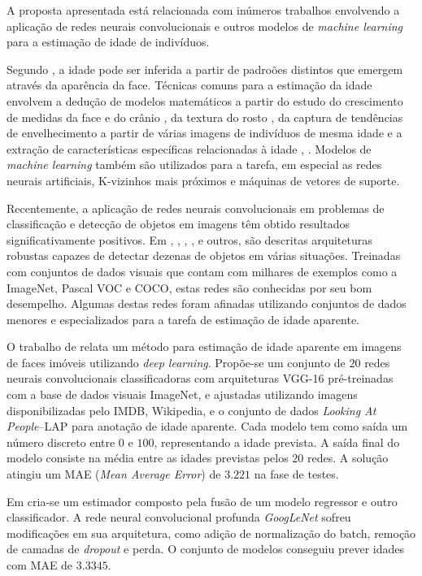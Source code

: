 A proposta apresentada está relacionada com inúmeros trabalhos envolvendo a aplicação de redes neurais convolucionais e outros modelos de \emph{machine learning} para a estimação de idade de indivíduos. 

Segundo \cite{fu2010age}, a idade pode ser inferida a partir de padroões distintos que emergem através da aparência da face. Técnicas comuns para a estimação da idade envolvem a dedução de modelos matemáticos a partir do estudo do crescimento de medidas da face e do crânio \cite{kwon1999age}, da textura do rosto \cite{lanitis2002toward}, da captura de tendências de envelhecimento a partir de várias imagens de indivíduos de mesma idade \cite{fu2007estimating} e a extração de características específicas relacionadas à idade \cite{suo2008design}, \cite{lou2018expression}. Modelos de \emph{machine learning} também são utilizados para a tarefa, em especial as redes neurais artificiais, K-vizinhos mais próximos e máquinas de vetores de suporte.

Recentemente, a aplicação de redes neurais convolucionais em problemas de classificação e detecção de objetos em imagens têm obtido resultados significativamente positivos. Em \cite{vggnet}, \cite{resnet}, \cite{inception}, \cite{redmon2016you}, \cite{ssd} e outros, são descritas arquiteturas robustas capazes de detectar dezenas de objetos em várias situações. Treinadas com conjuntos de dados visuais que contam com milhares de exemplos como a ImageNet, Pascal VOC e COCO, estas redes são conhecidas por seu bom desempelho. Algumas destas redes foram afinadas utilizando conjuntos de dados menores e especializados para a tarefa de estimação de idade aparente.

O trabalho de \cite{rothe2015dex} relata um método para estimação de idade aparente em imagens de faces imóveis utilizando \emph{deep learning}. Propõe-se um conjunto de $20$ redes neurais convolucionais classificadoras com arquiteturas VGG-16 pré-treinadas com a base de dados visuais ImageNet, e ajustadas utilizando imagens disponibilizadas pelo IMDB, Wikipedia, e o conjunto de dados \emph{Looking At People}--LAP para anotação de idade aparente. Cada modelo tem como saída um número discreto entre $0$ e $100$, representando a idade prevista. A saída final do modelo consiste na média entre as idades previstas pelos $20$ redes. A solução atingiu um MAE (\emph{Mean Average Error}) de $3.221$ na fase de testes.

Em \cite{liu2015agenet} cria-se um estimador composto pela fusão de um modelo regressor e outro classificador. A rede neural convolucional profunda \emph{GoogLeNet} \cite{inception} sofreu modificações em sua arquitetura, como adição de normalização do batch, remoção de camadas de \emph{dropout} e perda. O conjunto de modelos conseguiu prever idades com MAE de $3.3345$.

